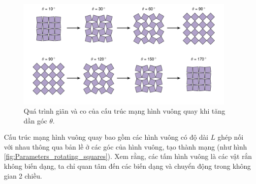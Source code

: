 \begin{figure}[!h]
    \centering
    \includegraphics[width=0.96\textwidth]{Problem_1/Figs_P1/Rotate_processing.pdf}
    \caption{Quá trình giãn và co của cấu trúc mạng hình vuông quay khi tăng dần góc \(\theta\).}
    \label{fig:Totate_processing}
\end{figure}

Cấu trúc mạng hình vuông quay bao gồm các hình vuông có độ dài \(L\) ghép nối với nhau thông qua bản lề ở các góc của hình vuông, tạo thành mạng (như hình \ref{fig:Parameters_rotating_squares}). Xem rằng, các tấm hình vuông là các vật rắn không biến dạng, ta chỉ quan tâm đến các biến dạng và chuyển động trong không gian 2 chiều.

